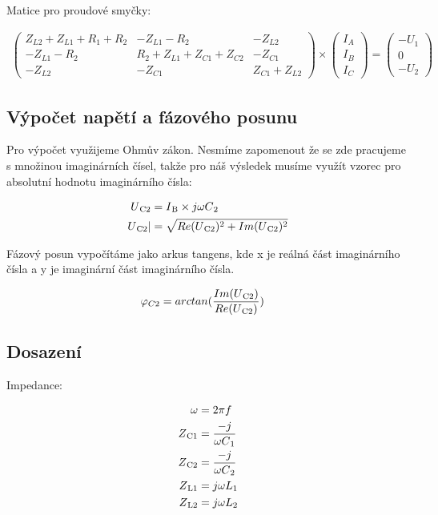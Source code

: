 Matice pro proudové smyčky:
	
\begin{align*}
	\begin{pmatrix}
		Z_{L2}+Z_{L1}+R_1+R_2&-Z_{L1}-R_2&-Z_{L2}\\ 
		-Z_{L1}-R_2&R_2+Z_{L1}+Z_{C1}+Z_{C2}&-Z_{C1}\\ 
		-Z_{L2}&-Z_{C1}&Z_{C1}+Z_{L2}
	\end{pmatrix}
	\times
	\begin{pmatrix}
		I_A\\ I_B\\ I_C
	\end{pmatrix}
	=
	\begin{pmatrix}
		-U_1\\ 0\\ -U_2
	\end{pmatrix}
\end{align*}

\subsection{Výpočet napětí a fázového posunu }
Pro výpočet  využijeme Ohmův zákon. Nesmíme zapomenout že se zde pracujeme s množinou imaginárních čísel, takže pro náš výsledek musíme využít vzorec pro absolutní hodnotu imaginárního čísla:

\begin{align*}
	U\textsubscript{C2} &= I\textsubscript{B}\times j\omega C\textsubscript{2} \\
	U\textsubscript{C2}| &= \sqrt{Re(U\textsubscript{C2})^2 + Im(U\textsubscript{C2})^2}
\end{align*}

Fázový posun vypočítáme jako arkus tangens, kde x je reálná část imaginárního čísla a y je imaginární část imaginárního čísla.

\begin{align*}
	\varphi_{C2}&= arctan(\frac{Im(U\textsubscript{C2})}{Re(U\textsubscript{C2})})
\end{align*}

\subsection{Dosazení}
Impedance:

\begin{align*}
	\omega &= 2\pi f \\
	Z\textsubscript{C1} &= \frac{-j}{\omega C\textsubscript{1}}\\
	Z\textsubscript{C2} &= \frac{-j}{\omega C\textsubscript{2}}\\
	Z\textsubscript{L1} &=  j\omega L\textsubscript{1} \\
	Z\textsubscript{L2} &=  j\omega L\textsubscript{2}
\end{align*}


